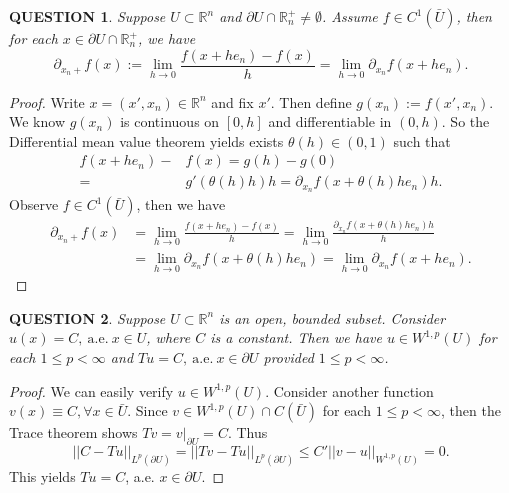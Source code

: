 \documentclass[12pt]{article}
\renewcommand{\(}{\left(}%
\renewcommand{\)}{\right)}%
\renewcommand{\[}{\left[}%
\renewcommand{\]}{\right]}%
\renewcommand{\r}{\mathbb{R}}
\newtheorem{question}{QUESTION}[section]}
\newtheorem{proof}{Proof.}}
\begin{document}
  \begin{question}
   Suppose $U\subset\r^n$ and $\partial U\cap \r_n^+\neq \emptyset$. Assume $f\in C^1(\bar{U})$, then for each $x\in\partial U\cap\r_n^+$, we have
   \begin{equation*}
    \partial_{x_n+} f(x):=\lim_{h\to0}\frac{f(x+he_n)-f(x)}{h}=\lim_{h\to 0} \partial_{x_n}f(x+he_n).
   \end{equation*}
  \end{question}
  \begin{proof}
   Write $x=(x',x_n)\in\r^n$ and fix $x'$. Then define $g(x_n):=f(x',x_n)$. We know $g(x_n)$ is continuous on $[0,h]$ and differentiable in $(0,h)$. So the {\sffamily Differential mean value theorem} yields exists $\theta(h)\in(0,1)$ such that
   \begin{equation*}
    \begin{split}
     f(x+he_n)-&f(x)=g(h)-g(0)\\
     =&g'(\theta(h) h)h=\partial_{x_n}f(x+\theta(h) h e_n )h.
    \end{split}
   \end{equation*}
   Observe $f\in C^1(\bar{U})$, then we have
   \begin{equation*}
    \begin{split}
     \partial_{x_n+} f(x)&=\lim_{h\to0}\frac{f(x+he_n)-f(x)}{h}=\lim_{h\to0}\frac{\partial_{x_n}f(x+\theta(h) h e_n )h}{h}\\
     &=\lim_{h\to0}\partial_{x_n}f(x+\theta(h) h e_n )=\lim_{h\to 0} \partial_{x_n}f(x+he_n).
    \end{split}
   \end{equation*}
  \end{proof}

  \begin{question}
   Suppose $U\subset\r^n$ is an open, bounded subset. Consider $u(x)= C,\ \mathrm{a.e.}\  x\in  U$, where $C$ is a constant. Then we have $u\in W^{1,p}(U)$ for each $1\leq p< \infty$ and $Tu=C,\ \mathrm{a.e.}\  x\in \partial U$ provided $1\leq p<\infty$.
  \end{question}
  \begin{proof}
   We can easily verify $u\in W^{1,p}(U)$. Consider another function $v(x)\equiv C,\forall x\in\bar{U}$. Since $v\in W^{1,p}(U)\cap C(\bar{U})$ for each $1\leq p<\infty$, then the {\sffamily Trace theorem} shows $Tv=v|_{\partial U}=C$. Thus
   \begin{equation*}
    ||C-Tu||_{L^p(\partial U )}=||Tv-Tu||_{L^p(\partial U )}\leq C'||v-u||_{W^{1,p}(U)}=0.
   \end{equation*}
   This yields $Tu=C$, a.e. $x\in\partial U$.
  \end{proof}
\end{document}

